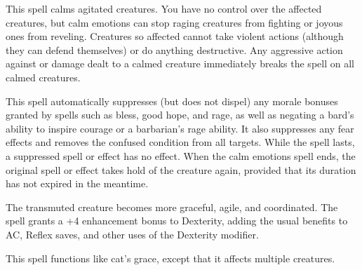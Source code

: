 \begin{multicols}{2}
\begin{small}
\noindent This spell calms agitated creatures. You have no control over the affected creatures, but calm emotions can stop raging creatures from fighting or joyous ones from reveling. Creatures so affected cannot take violent actions (although they can defend themselves) or do anything destructive. Any aggressive action against or damage dealt to a calmed creature immediately breaks the spell on all calmed creatures.

\smallskip\noindent This spell automatically suppresses (but does not dispel) any morale bonuses granted by spells such as bless, good hope, and rage, as well as negating a bard's ability to inspire courage or a barbarian's rage ability. It also suppresses any fear effects and removes the confused condition from all targets. While the spell lasts, a suppressed spell or effect has no effect. When the calm emotions spell ends, the original spell or effect takes hold of the creature again, provided that its duration has not expired in the meantime.

\noindent The transmuted creature becomes more graceful, agile, and coordinated. The spell grants a +4 enhancement bonus to Dexterity, adding the usual benefits to AC, Reflex saves, and other uses of the Dexterity modifier.


\noindent This spell functions like cat's grace, except that it affects multiple creatures.


\end{small}
\end{multicols}

